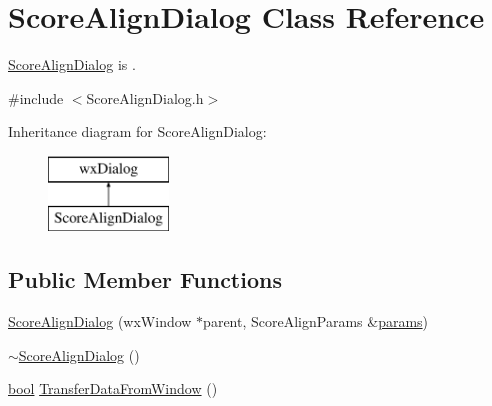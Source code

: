 \hypertarget{class_score_align_dialog}{}\section{Score\+Align\+Dialog Class Reference}
\label{class_score_align_dialog}


\hyperlink{class_score_align_dialog}{Score\+Align\+Dialog} is .  




{\ttfamily \#include $<$Score\+Align\+Dialog.\+h$>$}

Inheritance diagram for Score\+Align\+Dialog\+:\begin{figure}[H]
\begin{center}
\leavevmode
\includegraphics[height=2.000000cm]{class_score_align_dialog}
\end{center}
\end{figure}
\subsection*{Public Member Functions}
\begin{DoxyCompactItemize}
\item 
\hyperlink{class_score_align_dialog_ab5d006e6f408b1e145ce66b0dc13a71d}{Score\+Align\+Dialog} (wx\+Window $\ast$parent, Score\+Align\+Params \&\hyperlink{_reverb_8cpp_aacc5617877d2aa4d17c729c1c8ba4eec}{params})
\item 
\hyperlink{class_score_align_dialog_a7b9606beddc1bf14c6757344b23b35d9}{$\sim$\+Score\+Align\+Dialog} ()
\item 
\hyperlink{mac_2config_2i386_2lib-src_2libsoxr_2soxr-config_8h_abb452686968e48b67397da5f97445f5b}{bool} \hyperlink{class_score_align_dialog_a88fe66daefb02098c7826c5dc81e1bd4}{Transfer\+Data\+From\+Window} ()
\end{DoxyCompactItemize}

